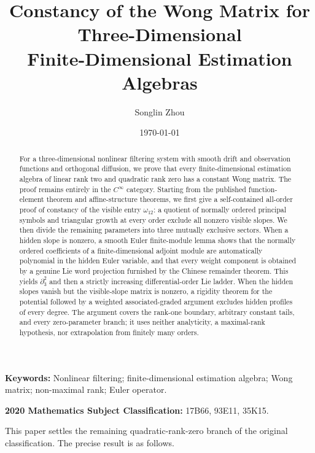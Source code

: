 \documentclass[11pt,a4paper]{article}
\title{\bfseries
Constancy of the Wong Matrix for Three-Dimensional\\
Finite-Dimensional Estimation Algebras}
\author{Songlin Zhou}
\date{\today}
\numberwithin{equation}{section}
\theoremstyle{journalplain}
\theoremstyle{journaldef}
\begin{document}
\maketitle
\vspace{-2.2em}

\begin{abstract}
For a three-dimensional nonlinear filtering system with smooth drift and
observation functions and orthogonal diffusion, we prove that every
finite-dimensional estimation algebra of linear rank two and quadratic rank
zero has a constant Wong matrix.  The proof remains entirely in the
$C^\infty$ category.  Starting from the published function-element theorem
and affine-structure theorems, we first give a self-contained all-order proof
of constancy of the visible entry $\omega_{12}$: a quotient of normally
ordered principal symbols and triangular growth at every order exclude all
nonzero visible slopes.  We then divide the remaining parameters into three
mutually exclusive sectors.  When a hidden slope is nonzero, a smooth Euler
finite-module lemma shows that the normally ordered coefficients of a
finite-dimensional adjoint module are automatically polynomial in the hidden
Euler variable, and that every weight component is obtained by a genuine Lie
word projection furnished by the Chinese remainder theorem.  This yields
$\partial_3^2$ and then a strictly increasing differential-order Lie ladder.
When the hidden slopes vanish but the visible-slope matrix is nonzero, a
rigidity theorem for the potential followed by a weighted associated-graded
argument excludes hidden profiles of every degree.  The argument covers the
rank-one boundary, arbitrary constant tails, and every zero-parameter branch;
it uses neither analyticity, a maximal-rank hypothesis, nor extrapolation from
finitely many orders.
\end{abstract}

\medskip
\noindent\textbf{Keywords:}
Nonlinear filtering; finite-dimensional estimation algebra; Wong matrix;
non-maximal rank; Euler operator.

\smallskip
\noindent\textbf{2020 Mathematics Subject Classification:}
17B66, 93E11, 35K15.


This paper settles the remaining quadratic-rank-zero branch of the original
classification. The precise result is as follows.
\end{document}
